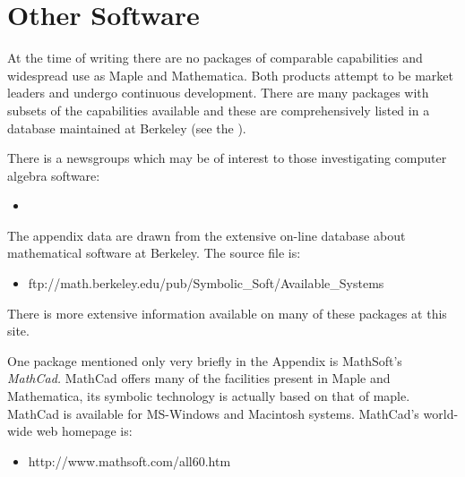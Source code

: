\section{\label{se_other_software}Other Software}

At the time of writing there are no packages of comparable capabilities and
widespread use as Maple and Mathematica.
Both products attempt to be market leaders and undergo continuous development.
There are many packages with subsets of the capabilities available and these
are comprehensively listed in a database maintained at Berkeley (see the
).

There is a newsgroups which may be of interest to those investigating
computer algebra software:

\begin{itemize}

\item {}

\end{itemize}

The appendix data are drawn from the extensive on-line database about
mathematical software at Berkeley.  The source file is:

\begin{itemize}

\item {}
       {ftp://math.berkeley.edu/pub/Symbolic_Soft/Available_Systems}

\end{itemize}

There is more extensive information available on many of these packages
at this site.

One package mentioned only very briefly in the Appendix is MathSoft's
{\sl MathCad.}  MathCad offers many of the facilities present in Maple
and Mathematica, its symbolic technology is actually based on that of
maple.  MathCad is available for MS-Windows and Macintosh systems.
MathCad's world-wide web homepage is:

\begin{itemize}

\item {}
       {http://www.mathsoft.com/all60.htm}

\end{itemize}

